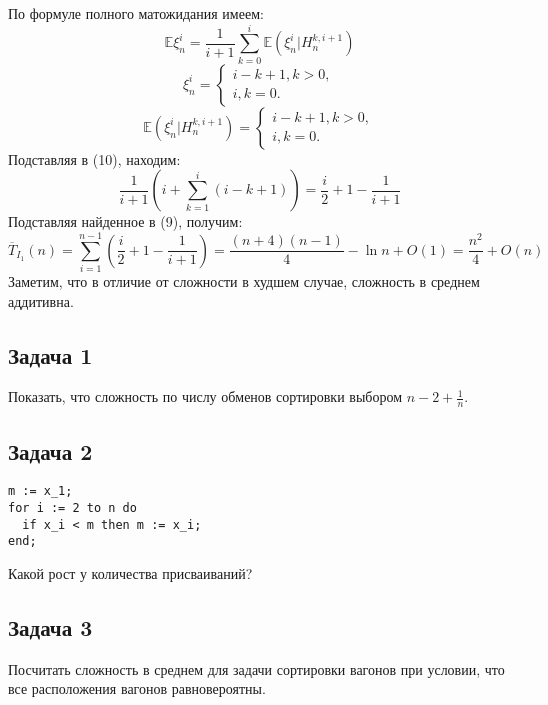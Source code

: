 \documentclass[11pt]{article}
\newcounter{th}\setcounter{th}{0}
\begin{document}
По формуле полного матожидания имеем:
\begin{equation}
\mathbb{E}\xi_n^i = \frac1{i + 1}\sum_{k = 0}^i\mathbb{E}(\xi_n^i | H_n^{k, i + 1})
\end{equation}
\begin{equation}
\xi_n^i = \begin{cases}
i - k + 1, k > 0, \\
i, k = 0.
\end{cases}
\end{equation}
\begin{equation}
\mathbb{E}(\xi_n^i | H_n^{k, i + 1}) = \begin{cases}
i - k + 1, k > 0, \\
i, k = 0.
\end{cases}
\end{equation}
Подставляя в (10), находим:
\begin{equation}
\frac1{i + 1}\left(i + \sum_{k = 1}^i(i - k + 1)\right) = \frac{i}2 + 1 - \frac1{i + 1}
\end{equation}
Подставляя найденное в (9), получим:
\begin{equation}
\overline{T}_{I_1}(n) = \sum_{i = 1}^{n - 1}\left(\frac{i}2 + 1 - \frac1{i + 1}\right)
= \frac{(n + 4)(n - 1)}4 - \ln n + O(1) = \frac{n^2}4 + O(n)
\end{equation}
Заметим, что в отличие от сложности в худшем случае, сложность в среднем аддитивна.
\subsection{Задача 1}
\label{sec:org42c7b0c}
Показать, что сложность по числу обменов сортировки выбором \(n - 2 + \frac1n\).
\subsection{Задача 2}
\label{sec:org2aef6cd}
\begin{verbatim}
m := x_1;
for i := 2 to n do
  if x_i < m then m := x_i;
end;
\end{verbatim}
Какой рост у количества присваиваний?
\subsection{Задача 3}
\label{sec:orgf33dab6}
Посчитать сложность в среднем для задачи сортировки вагонов при условии, что все расположения
вагонов равновероятны.
\end{document}
